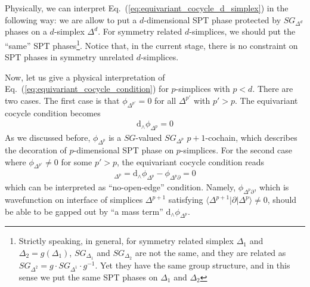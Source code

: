 \documentclass[reprint,amsmath,amssymb,aps,pra,]{revtex4-1}
\newcommand{\dd}{\mathrm{d}} %
\newcommand{\TT}{\mathcal{T}} %
\begin{document}
Physically, we can interpret Eq.~(\ref{eq:equivariant_cocycle_d_simplex}) in the following way: we are allow to put a $d$-dimensional SPT phase protected by $SG_{\Delta^d}$ phases on a $d$-simplex $\Delta^d$. 
For symmetry related $d$-simplices, we should put the ``same'' SPT phases\footnote{Strictly speaking, in general, for symmetry related simplex $\Delta_1$ and $\Delta_2=g(\Delta_1)$, $SG_{\Delta_1}$ and $SG_{\Delta_2}$ are not the same, and they are related as $SG_{\Delta^2}=g\cdot SG_{\Delta^1}\cdot g^{-1}$.
Yet they have the same group structure, and in this sense we put the same SPT phases on $\Delta_1$ and $\Delta_2$}.
Notice that, in the current stage, there is no constraint on SPT phases in symmetry unrelated $d$-simplices.

Now, let us give a physical interpretation of Eq.~(\ref{eq:equivariant_cocycle_condition}) for $p$-simplices with $p<d$.
There are two cases.
The first case is that $\phi_{\Delta^{p'}}=0$ for all $\Delta^{p'}$ with $p'>p$.
The equivariant cocycle condition becomes
\begin{align}
  \dd_\wedge\phi_{\Delta^p}=0
  \label{}
\end{align}
As we discussed before, $\phi_{\Delta^p}$ is a $SG$-valued $SG_{\Delta^p}$ $p+1$-cochain, which describes the decoration of $p$-dimensional SPT phase on $p$-simplices.
For the second case where $\phi_{\Delta^{p'}}\neq 0$ for some $p'>p$, the equivariant cocycle condition reads
\begin{align}
  [(\dd_\wedge-\dd_>)\phi]_{\Delta^p}=\dd_\wedge\phi_{\Delta^p}-\phi_{\Delta^p\partial}=0
  \label{}
\end{align}
which can be interpreted as ``no-open-edge'' condition.
Namely, $\phi_{\Delta^p\partial}$, which is wavefunction on interface of simplices $\Delta^{p+1}$ satisfying $\langle\Delta^{p+1}|\partial|\Delta^p\rangle\neq0$, should be able to be gapped out by ``a mass term'' $\dd_\wedge\phi_{\Delta^p}$.

%
\end{document}
